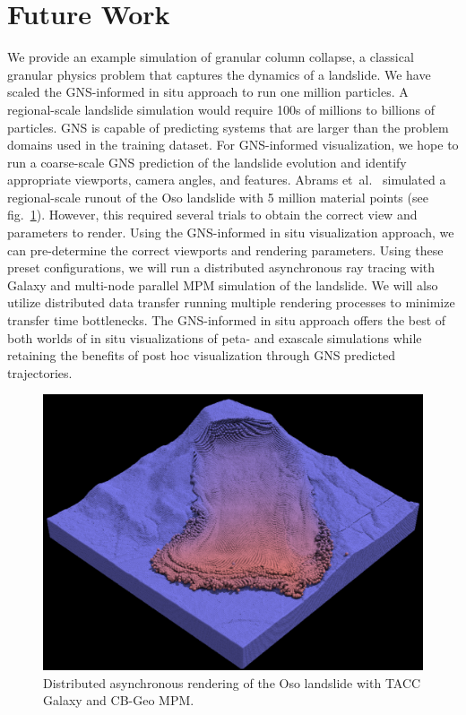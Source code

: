 \documentclass{vgtc}
\begin{document}
\section{Future Work}
\label{sec:futurework}
We provide an example simulation of granular column collapse, a classical granular physics problem that captures the dynamics of a landslide. We have scaled the GNS-informed in situ approach to run one million particles. A regional-scale landslide simulation would require 100s of millions to billions of particles. GNS is capable of predicting systems that are larger than the problem domains used in the training dataset. For GNS-informed visualization, we hope to run a coarse-scale GNS prediction of the landslide evolution and identify appropriate viewports, camera angles, and features. Abrams et~al.~\cite{abram22insitu} simulated a regional-scale runout of the Oso landslide with 5 million material points (see fig.~\ref{fig:oso}). However, this required several trials to obtain the correct view and parameters to render. Using the GNS-informed in situ visualization approach, we can pre-determine the correct viewports and rendering parameters. Using these preset configurations, we will run a distributed asynchronous ray tracing with Galaxy and multi-node parallel MPM simulation of the landslide. We will also utilize distributed data transfer running multiple rendering processes to minimize transfer time bottlenecks. The GNS-informed in situ approach offers the best of both worlds of in situ visualizations of peta- and exascale simulations while retaining the benefits of post hoc visualization through GNS predicted trajectories.


\begin{figure}
    \centering
    \includegraphics[width=\linewidth]{figs/oso.png}
    \caption{Distributed asynchronous rendering of the Oso landslide with TACC Galaxy and CB-Geo MPM.}
    \label{fig:oso}
\end{figure}
\end{document}
